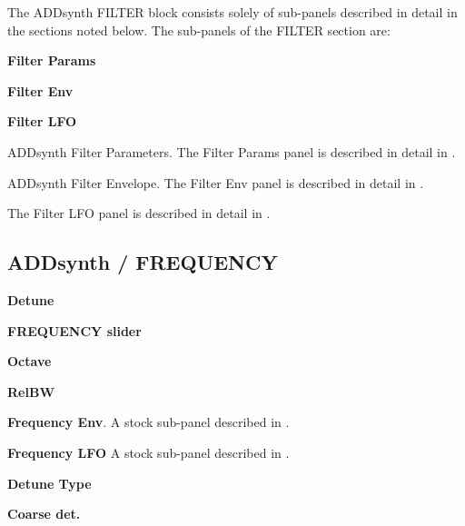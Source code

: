    The ADDsynth FILTER block consists solely of sub-panels
   described in detail in the sections noted below.  The
   sub-panels of the FILTER section are:

   \begin{enumber}
      \item \textbf{Filter Params}
      \item \textbf{Filter Env}
      \item \textbf{Filter LFO}
   \end{enumber}

   \setcounter{ItemCounter}{0}      %

   ADDsynth Filter Parameters.
   The Filter Params panel is described in detail in
   .

   ADDsynth Filter Envelope.
   The Filter Env panel is described in detail in
   .

   The Filter LFO panel is described in detail in
   .

\subsection{ADDsynth / FREQUENCY}
\label{subsec:addsynth_frequency}

   \begin{enumber}
      \item \textbf{Detune}
      \item \textbf{FREQUENCY slider}
      \item \textbf{Octave}
      \item \textbf{RelBW}
      \item \textbf{Frequency Env}.
         A stock sub-panel described in
         .
      \item \textbf{Frequency LFO}
         A stock sub-panel described in
         .
      \item \textbf{Detune Type}
      \item \textbf{Coarse det.}
   \end{enumber}

   \setcounter{ItemCounter}{0}      %

